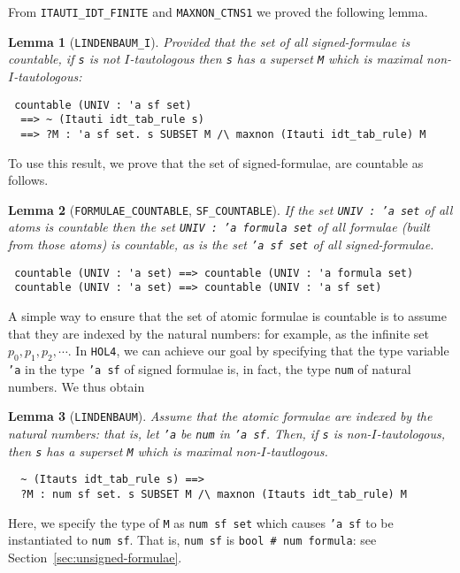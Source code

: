 \documentclass[a4paper]{article}
\newtheorem{lemma}{Lemma}
\newcommand{\hol}{\texttt{HOL4}}
\begin{document}
From \texttt{ITAUTI\_IDT\_FINITE} and \texttt{MAXNON\_CTNS1} we proved
the following lemma.
\begin{lemma}[\texttt{LINDENBAUM\_I}]\label{LINDENBAUM-I}
  Provided that the set of all signed-formulae is countable, 
  if \texttt{s} is not $I$-tautologous then \texttt{s} has a superset 
\texttt{M} which is maximal non-$I$-tautologous:
\end{lemma}
\begin{verbatim}
 countable (UNIV : 'a sf set) 
  ==> ~ (Itauti idt_tab_rule s) 
  ==> ?M : 'a sf set. s SUBSET M /\ maxnon (Itauti idt_tab_rule) M
\end{verbatim}

To use this result, we prove that
the set of signed-formulae, are countable as follows.
\begin{lemma}[\texttt{FORMULAE\_COUNTABLE}, \texttt{SF\_COUNTABLE}]
\label{FORMULAE-COUNTABLE}
\label{SF-COUNTABLE}
If the set \texttt{UNIV : 'a set} of all atoms is countable then the set
\texttt{UNIV : 'a formula set} of all formulae (built from
those atoms) is countable, as is the set
\texttt{'a sf set} of all signed-formulae.
\end{lemma}
\begin{verbatim}
 countable (UNIV : 'a set) ==> countable (UNIV : 'a formula set)
 countable (UNIV : 'a set) ==> countable (UNIV : 'a sf set)
\end{verbatim}

A simple way to ensure that the set of atomic formulae is countable is
to assume that they are indexed by the natural numbers: for example,
as the infinite set $p_0, p_1, p_2, \cdots$. In \hol{}, we can achieve
our goal by specifying that the type variable \texttt{'a} in the type
\texttt{'a sf} of signed formulae is, in fact, the type \texttt{num}
of natural numbers. 
We thus obtain %

\begin{lemma}[\texttt{LINDENBAUM}]\label{LINDENBAUM}
  Assume that the atomic formulae are indexed by the natural numbers:
  that is, let \texttt{'a} be \texttt{num} in \texttt{'a sf}.
  Then, if \texttt{s} is non-$I$-tautologous, then \texttt{s}
  has a superset \texttt{M} which is maximal non-$I$-tautlogous.
\end{lemma}
\begin{verbatim}
  ~ (Itauts idt_tab_rule s) ==>
  ?M : num sf set. s SUBSET M /\ maxnon (Itauts idt_tab_rule) M
\end{verbatim}
Here, we specify the type of \texttt{M} as \texttt{num sf set}
which causes \texttt{'a sf} to be instantiated to \texttt{num sf}.
That is, \texttt{num sf} is \texttt{bool \# num formula}: see
Section~\ref{sec:unsigned-formulae}.
\end{document}
